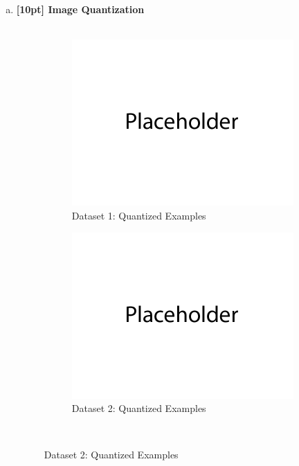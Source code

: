 \documentclass{article}
\begin{document}
\newpage
{}

\begin{enumerate}[(a)]
\item {\bf [10pt] Image Quantization} \\\\
\begin{figure}[H]
    \centering
    \begin{subfigure}{0.45\textwidth}
        \centering
        \includegraphics[width=\textwidth]{figures/placeholder.png}
        \caption{Dataset 1: Quantized Examples}
    \end{subfigure}
    \hspace{0.2in}
    \begin{subfigure}{0.45\textwidth}
        \centering
        \includegraphics[width=\textwidth]{figures/placeholder.png}
        \caption{Dataset 2: Quantized Examples}
    \end{subfigure} \\
\end{figure}


\end{enumerate}
\end{document}

